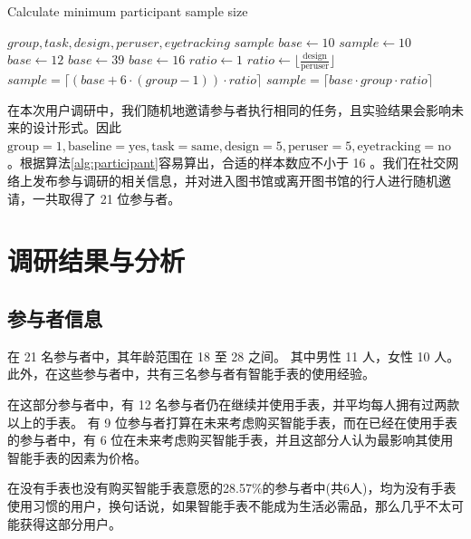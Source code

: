 \begin{algorithm}[H]
\caption{Calculate minimum participant sample size}
\label{alg:participant}
\begin{algorithmic}
\REQUIRE $group, task, design, peruser, eyetracking$
\ENSURE $sample$
\STATE $base \leftarrow 10$
\STATE $sample \leftarrow 10$
\STATE $base \leftarrow 12$
\STATE $base \leftarrow 39$
\ENDIF
{}
\STATE $base \leftarrow 16$
\ENDIF
{}
\STATE $ratio \leftarrow 1$
\ELSE
\STATE $ratio \leftarrow \lfloor\frac{\text{design}}{\text{peruser}}\rfloor$
\ENDIF
{}
    \STATE $sample = \lceil (base + 6 \cdot (group - 1)) \cdot ratio \rceil$
\ELSE
    \STATE $sample = \lceil base \cdot group \cdot ratio \rceil$
\ENDIF
\end{algorithmic}
\end{algorithm}

在本次用户调研中，我们随机地邀请参与者执行相同的任务，且实验结果会影响未来的设计形式。因此 $\text{group}=1, \text{baseline}=\text{yes}, \text{task}=\text{same}, \text{design}=5, \text{peruser}=5, \text{eyetracking}=\text{no}$ 。根据算法\ref{alg:participant}容易算出，合适的样本数应不小于 16 。我们在社交网络上发布参与调研的相关信息，并对进入图书馆或离开图书馆的行人进行随机邀请，一共取得了 21 位参与者。

\section{调研结果与分析}

\subsection{参与者信息}

在 21 名参与者中，其年龄范围在 18 至 28 之间。%
其中男性 11 人，女性 10 人。此外，在这些参与者中，共有三名参与者有智能手表的使用经验。

在这部分参与者中，有 12 名参与者仍在继续并使用手表，并平均每人拥有过两款以上的手表。
有 9 位参与者打算在未来考虑购买智能手表，而在已经在使用手表的参与者中，有 6 位在未来考虑购买智能手表，并且这部分人认为最影响其使用智能手表的因素为价格。

在没有手表也没有购买智能手表意愿的28.57\%的参与者中(共6人)，均为没有手表使用习惯的用户，换句话说，如果智能手表不能成为生活必需品，那么几乎不太可能获得这部分用户。



